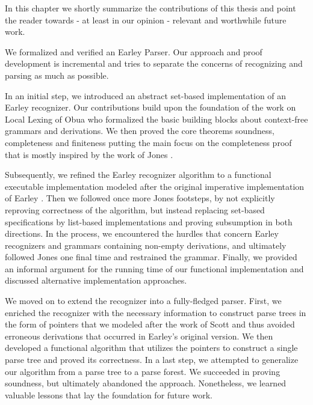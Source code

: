 %
\begin{isabellebody}%
%
%
\isadelimtheory
%
\endisadelimtheory
%
\isatagtheory
%
\endisatagtheory
{\isafoldtheory}%
%
\isadelimtheory
%
\endisadelimtheory
%
\isadelimdocument
%
\endisadelimdocument
%
\isatagdocument
%
\isamarkuptrue%
%
\endisatagdocument
{\isafolddocument}%
%
\isadelimdocument
%
\endisadelimdocument
%
\begin{isamarkuptext}%
In this chapter we shortly summarize the contributions of this thesis and point the reader towards
- at least in our opinion - relevant and worthwhile future work.%
\end{isamarkuptext}\isamarkuptrue%
%
\isadelimdocument
%
\endisadelimdocument
%
\isatagdocument
%
\isamarkuptrue%
%
\endisatagdocument
{\isafolddocument}%
%
\isadelimdocument
%
\endisadelimdocument
%
\begin{isamarkuptext}%
We formalized and verified an Earley Parser. Our approach and proof development is incremental and
tries to separate the concerns of recognizing and parsing as much as possible.

In an initial step, we introduced an abstract set-based implementation of an Earley recognizer. Our contributions
build upon the foundation of the work on Local Lexing of Obua \cite{Obua:2017} \cite{LocalLexing-AFP}
who formalized the basic building blocks about context-free grammars and derivations. We then proved
the core theorems soundness, completeness and finiteness putting the main focus on the completeness proof
that is mostly inspired by the work of Jones \cite{Jones:1972}.

Subsequently, we refined the Earley recognizer algorithm to a functional executable implementation modeled
after the original imperative implementation of Earley \cite{Earley:1970}. Then we followed once more
Jones footsteps, by not explicitly reproving correctness of the algorithm, but instead replacing set-based
specifications by list-based implementations and proving subsumption in both directions. In the process,
we encountered the hurdles that concern Earley recognizers and grammars containing non-empty derivations, and
ultimately followed Jones one final time and restrained the grammar. Finally, we provided an informal argument
for the running time of our functional implementation and discussed alternative implementation approaches.

We moved on to extend the recognizer into a fully-fledged parser. First, we enriched the recognizer with
the necessary information to construct parse trees in the form of pointers that we modeled after the work
of Scott \cite{Scott:2008} and thus avoided erroneous derivations that occurred in Earley's original
version. We then developed a functional algorithm that utilizes the pointers to construct a single parse tree
and proved its correctness. In a last step, we attempted to generalize our algorithm from a parse tree to
a parse forest. We succeeded in proving soundness, but ultimately abandoned the approach.
Nonetheless, we learned valuable lessons that lay the foundation for future work.


\end{isamarkuptext}
\end{isabellebody}
